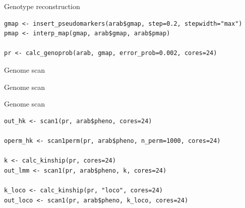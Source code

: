 \documentclass[12pt,t,aspectratio=169]{beamer}
\begin{document}
\begin{frame}[c,fragile]{Genotype reconstruction}

\begin{center} \begin{minipage}[c]{11.5cm} \begin{semiverbatim}
\begin{lstlisting}[linewidth=11.5cm]
gmap <- insert_pseudomarkers(arab$gmap, step=0.2, stepwidth="max")
pmap <- interp_map(gmap, arab$gmap, arab$pmap)

pr <- calc_genoprob(arab, gmap, error_prob=0.002, cores=24)
\end{lstlisting}
\end{semiverbatim} \end{minipage} \end{center}

\end{frame}



\begin{frame}[c]{Genome scan}


\end{frame}

\begin{frame}[c]{Genome scan}


\end{frame}


\begin{frame}[c,fragile]{Genome scan}

\begin{center} \begin{minipage}[c]{11.3cm} \begin{semiverbatim}
\begin{lstlisting}[linewidth=11.3cm]
out_hk <- scan1(pr, arab$pheno, cores=24)

operm_hk <- scan1perm(pr, arab$pheno, n_perm=1000, cores=24)

k <- calc_kinship(pr, cores=24)
out_lmm <- scan1(pr, arab$pheno, k, cores=24)

k_loco <- calc_kinship(pr, "loco", cores=24)
out_loco <- scan1(pr, arab$pheno, k_loco, cores=24)
\end{lstlisting}
\end{semiverbatim} \end{minipage} \end{center}

\end{frame}
\end{document}

